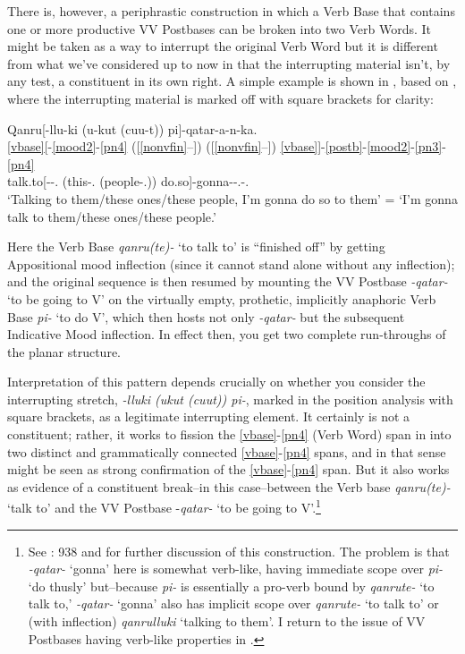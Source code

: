 \documentclass[output=paper]{langscibook}
\begin{document}
There is, however, a periphrastic construction in which a Verb Base that contains one or more productive VV Postbases can be broken into two Verb Words. It might be taken as a way to interrupt the original Verb Word but it is different from what we've considered up to now in that the interrupting material isn't, by any test, a constituent in its own right. A simple example is shown in , based on , where the interrupting material is marked off with square brackets for clarity:

\ea\label{ex:key:27}
\glll Qanru[-llu-ki (u-kut (cuu-t)) pi]-qatar-a-n-ka.\\
    \ref{vbase}[-\ref{mood2}-\ref{pn4} ([\ref{nonvfin}--]) ([\ref{nonvfin}--]) \ref{vbase}]-\ref{postb}-\ref{mood2}-\ref{pn3}-\ref{pn4} \\
     talk.to[-\Appos-\Tpl.\Obj{} (this-\Abs.\Pl{} (people-\Abs.\Pl{})) do.so]-gonna-\Ind{}-\Tpl.\Obj{}-\Fsg.\Aarg{}\\
\glt `Talking to them/these ones/these people, I'm gonna do so to them' = `I'm gonna talk to them/these ones/these people.'
\z

Here the Verb Base \textit{qanru(te)-} `to talk to' is “finished off” by getting Appositional mood inflection (since it cannot stand alone without any inflection); and the original sequence is then resumed by mounting the VV Postbase \textit{{}-qatar-} `to be going to V' on the virtually empty, prothetic, implicitly anaphoric Verb Base \textit{pi-} `to do V', which then hosts not only \textit{{}-qatar-} but the subsequent Indicative Mood inflection. In effect then, you get two complete run-throughs of the planar structure.

Interpretation of this pattern depends crucially on whether you consider the interrupting stretch, \textit{{}-lluki (ukut (cuut)) pi-}, marked in the position analysis with square brackets, as a legitimate interrupting element. It certainly is not a constituent; rather, it works to fission the \ref{vbase}-\ref{pn4} (Verb Word) span in  into two distinct and grammatically connected \ref{vbase}-\ref{pn4} spans, and in that sense might be seen as strong confirmation of the \ref{vbase}-\ref{pn4} span. But it also works as evidence of a constituent break--in this case--between the Verb base \textit{qanru(te)-} `talk to' and the VV Postbase -\textit{qatar-} `to be going to V'.\footnote{See \citealt{Miyaoka2012}: 938 and \citealt[545--546]{Woodbury2017} for further discussion of this construction. The problem is that \textit{{}-qatar-} `gonna' here is somewhat verb-like, having immediate scope over \textit{pi-} `do thusly' but--because \textit{pi-} is essentially a pro-verb bound by \textit{qanrute-} `to talk to,' \textit{{}-qatar-} `gonna' also has implicit scope over \textit{qanrute-} `to talk to' or (with inflection) \textit{qanrulluki} `talking to them'. I return to the issue of VV Postbases having verb-like properties in .}
\end{document}
